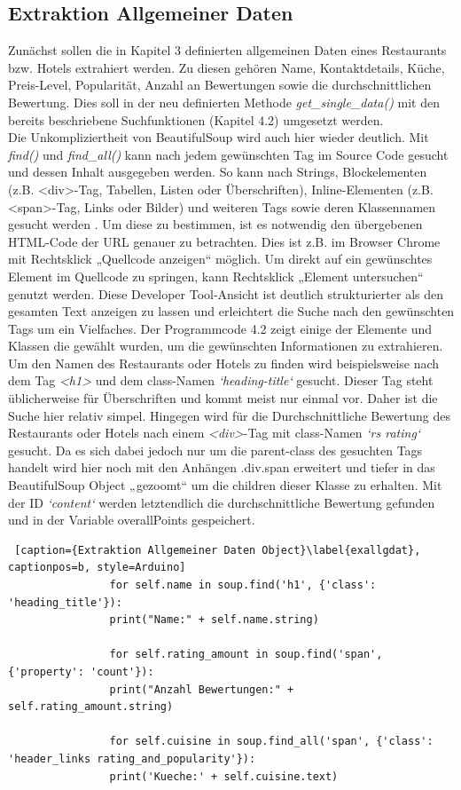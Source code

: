 \documentclass[a4paper,oneside,12pt]{report}
\begin{document}
			\subsection{Extraktion Allgemeiner Daten}			
				Zunächst sollen die in Kapitel 3 definierten allgemeinen Daten eines Restaurants bzw. Hotels extrahiert werden. Zu diesen gehören Name, Kontaktdetails, Küche, Preis-Level, Popularität, Anzahl an Bewertungen sowie die durchschnittlichen Bewertung. Dies soll in der neu definierten Methode \textit{get\_single\_data()}  mit den bereits beschriebene Suchfunktionen (Kapitel 4.2) umgesetzt werden.
				\\ 
				Die Unkompliziertheit von BeautifulSoup wird auch hier wieder deutlich. Mit \textit{find()} und \textit{find\_all()} kann nach jedem gewünschten Tag im Source Code gesucht und dessen Inhalt ausgegeben werden. So kann nach Strings, Blockelementen (z.B. <div>-Tag, Tabellen, Listen oder Überschriften), Inline-Elementen (z.B. <span>-Tag, Links oder Bilder) und weiteren Tags sowie deren Klassennamen gesucht werden \cite{bib-bs4}.
				Um diese zu bestimmen, ist es notwendig den übergebenen HTML-Code der URL genauer zu betrachten. Dies ist z.B. im Browser Chrome mit Rechtsklick „Quellcode anzeigen“ möglich. Um direkt auf ein gewünschtes Element im Quellcode zu springen, kann Rechtsklick „Element untersuchen“ genutzt werden. Diese Developer Tool-Ansicht ist deutlich strukturierter als den gesamten Text anzeigen zu lassen und erleichtert die Suche nach den gewünschten Tags um ein Vielfaches.
				\newline
				Der Programmcode 4.2 zeigt einige der Elemente und Klassen die gewählt wurden, um die gewünschten Informationen zu extrahieren.
				Um den Namen des Restaurants oder Hotels zu finden wird beispielsweise nach dem Tag \textit{<h1>} und dem class-Namen \textit{‘heading-title‘} gesucht. Dieser Tag steht üblicherweise für Überschriften und kommt meist nur einmal vor. Daher ist die Suche hier relativ simpel. Hingegen wird für die Durchschnittliche Bewertung des Restaurants oder Hotels nach einem \textit{<div>}-Tag mit class-Namen \textit{‘rs rating‘} gesucht. Da es sich dabei jedoch nur um die parent-class des gesuchten Tags handelt wird hier noch mit den Anhängen .div.span erweitert und tiefer in das BeautifulSoup Object „gezoomt“ um die children dieser Klasse zu erhalten. Mit der ID \textit{‘content‘} werden letztendlich die durchschnittliche Bewertung gefunden und in der Variable overallPoints gespeichert.
				\\
				\begin{lstlisting} [caption={Extraktion Allgemeiner Daten Object}\label{exallgdat}, captionpos=b, style=Arduino]
				for self.name in soup.find('h1', {'class': 'heading_title'}):
				print("Name:" + self.name.string)
				
				for self.rating_amount in soup.find('span', {'property': 'count'}):
				print("Anzahl Bewertungen:" + self.rating_amount.string)
				
				for self.cuisine in soup.find_all('span', {'class': 'header_links rating_and_popularity'}):
				print('Kueche:' + self.cuisine.text)
				\end{lstlisting}
				
\end{document}
